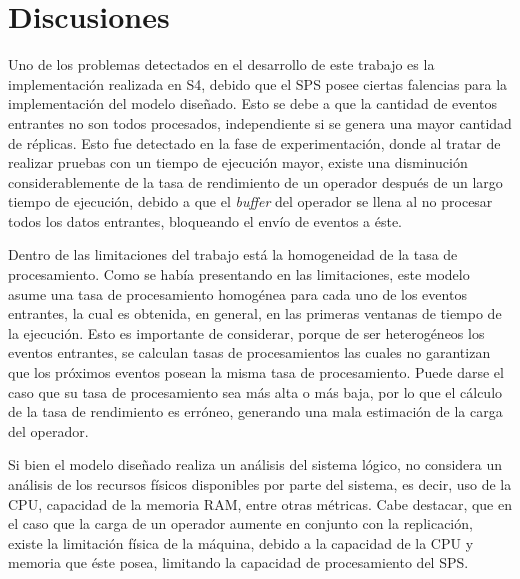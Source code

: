 \section{Discusiones}

Uno de los problemas detectados en el desarrollo de este trabajo es la implementación realizada en S4, debido que el SPS posee ciertas falencias para la implementación del modelo diseñado. Esto se debe a que la cantidad de eventos entrantes no son todos procesados, independiente si se genera una mayor cantidad de réplicas. Esto fue detectado en la fase de experimentación, donde al tratar de realizar pruebas con un tiempo de ejecución mayor, existe una disminución considerablemente de la tasa de rendimiento de un operador después de un largo tiempo de ejecución, debido a que el \textit{buffer} del operador se llena al no procesar todos los datos entrantes, bloqueando el envío de eventos a éste.


Dentro de las limitaciones del trabajo está la homogeneidad de la tasa de procesamiento. Como se había presentando en las limitaciones, este modelo asume una tasa de procesamiento homogénea para cada uno de los eventos entrantes, la cual es obtenida, en general, en las primeras ventanas de tiempo de la ejecución. Esto es importante de considerar, porque de ser heterogéneos los eventos entrantes, se calculan tasas de procesamientos las cuales no garantizan que los próximos eventos posean la misma tasa de procesamiento. Puede darse el caso que su tasa de procesamiento sea más alta o más baja, por lo que el cálculo de la tasa de rendimiento es erróneo, generando una mala estimación de la carga del operador.

Si bien el modelo diseñado realiza un análisis del sistema lógico, no considera un análisis de los recursos físicos disponibles por parte del sistema, es decir, uso de la CPU, capacidad de la memoria RAM, entre otras métricas. Cabe destacar, que en el caso que la carga de un operador aumente en conjunto con la replicación, existe la limitación física de la máquina, debido a la capacidad de la CPU y memoria que éste posea, limitando la capacidad de procesamiento del SPS.

